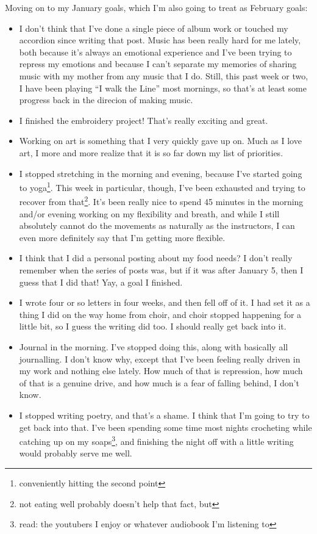 \documentclass[12pt]{article}[titlepage]
\newcommand{\say}[1]{``#1''}
\renewcommand{\,}{\textsuperscript{,}}
\begin{document}
Moving on to my January goals, which I'm also going to treat as February goals:  
\begin{itemize}  
\item I don't think that I've done a single piece of album work or touched my accordion since writing that post.  
Music has been really hard for me lately, both because it's always an emotional experience and I've been trying to repress my emotions and because I can't separate my memories of sharing music with my mother from any music that I do.  
Still, this past week or two, I have been playing \say{I walk the Line} most mornings, so that's at least some progress back in the direcion of making music.  
\item I finished the embroidery project! That's really exciting and great.  
\item Working on art is something that I very quickly gave up on. Much as I love art, I more and more realize that it is so far down my list of priorities.  
\item I stopped stretching in the morning and evening, because I've started going to yoga\footnote{conveniently hitting the second point}. This week in particular, though, I've been exhausted and trying to recover from that\footnote{not eating well probably doesn't help that fact, but}.  
It's been really nice to spend 45 minutes in the morning and/or evening working on my flexibility and breath, and while I still absolutely cannot do the movements as naturally as the instructors, I can even more definitely say that I'm getting more flexible.  
\item I think that I did a personal posting about my food needs? I don't really remember when the series of posts was, but if it was after January 5, then I guess that I did that! Yay, a goal I finished.  
\item I wrote four or so letters in four weeks, and then fell off of it. I had set it as a thing I did on the way home from choir, and choir stopped happening for a little bit, so I guess the writing did too. I should really get back into it.  
\item Journal in the morning. I've stopped doing this, along with basically all journalling. I don't know why, except that I've been feeling really driven in my work and nothing else lately. How much of that is repression, how much of that is a genuine drive, and how much is a fear of falling behind, I don't know.  
\item I stopped writing poetry, and that's a shame. I think that I'm going to try to get back into that. I've been spending some time most nights crocheting while catching up on my soaps\footnote{read: the youtubers I enjoy or whatever audiobook I'm listening to}, and finishing the night off with a little writing would probably serve me well.  

\end{itemize}
\end{document}
